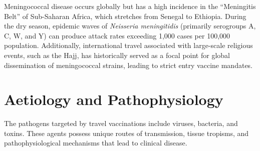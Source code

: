 Meningococcal disease occurs globally but has a high incidence in the ``Meningitis Belt'' of Sub-Saharan Africa, which stretches from Senegal to Ethiopia. During the dry season, epidemic waves of \textit{Neisseria meningitidis} (primarily serogroups A, C, W, and Y) can produce attack rates exceeding 1,000 cases per 100,000 population. Additionally, international travel associated with large-scale religious events, such as the Hajj, has historically served as a focal point for global dissemination of meningococcal strains, leading to strict entry vaccine mandates.

\section*{Aetiology and Pathophysiology}
The pathogens targeted by travel vaccinations include viruses, bacteria, and toxins. These agents possess unique routes of transmission, tissue tropisms, and pathophysiological mechanisms that lead to clinical disease.
